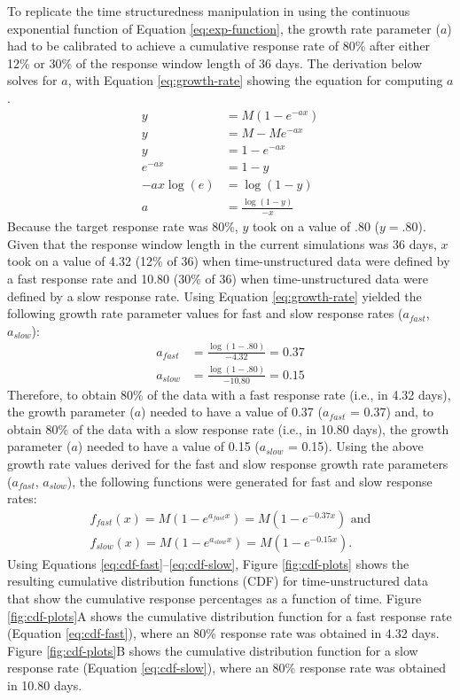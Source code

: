 \documentclass[
12pt, %
twoside,
english]{guelphthesis}
\begin{document}
To replicate the time structuredness manipulation in \textcite{coulombe2016} using the continuous exponential function of Equation \ref{eq:exp-function}, the growth rate parameter (\(a\)) had to be calibrated to achieve a cumulative response rate of 80\% after either 12\% or 30\% of the response window length of 36 days. The derivation below solves for \(a\), with Equation \ref{eq:growth-rate} showing the equation for computing \(a\).
\begin{align}
y  &= M(1 - e^{-ax}) \nonumber \\
y &= M - Me^{-ax} \nonumber \\
y &= 1 -e^{-ax} \nonumber \\
e^{-ax} &= 1-y \nonumber \\
-ax\log(e) &= \log(1 - y) \nonumber \\
a &= \frac{\log(1 - y)}{-x}
\label{eq:growth-rate}
\end{align}
\noindent Because the target response rate was 80\%, \(y\) took on a value of .80 (\(y = .80\)). Given that the response window length in the current simulations was 36 days, \(x\) took on a value of 4.32 (12\% of 36) when time-unstructured data were defined by a fast response rate and 10.80 (30\% of 36) when time-unstructured data were defined by a slow response rate. Using Equation \ref{eq:growth-rate} yielded the following growth rate parameter values for fast and slow response rates (\(a_{fast}\), \(a_{slow}\)):
\begin{align}
a_{fast} &= \frac{\log(1 - .80)}{-4.32} = 0.37 \nonumber \\
a_{slow} &= \frac{\log(1 - .80)}{-10.80} = 0.15 \nonumber
\end{align}
\noindent Therefore, to obtain 80\% of the data with a fast response rate (i.e., in 4.32 days), the growth parameter (\(a\)) needed to have a value of 0.37 (\(a_{fast}\) = 0.37) and, to obtain 80\% of the data with a slow response rate (i.e., in 10.80 days), the growth parameter (\(a\)) needed to have a value of 0.15 (\(a_{slow}\) = 0.15). Using the above growth rate values derived for the fast and slow response growth rate parameters (\(a_{fast}\), \(a_{slow}\)), the following functions were generated for fast and slow response rates:
\begin{align}
f_{fast}(x) = M(1 - e^{a_{fast}x}) = M(1 - e^{-0.37x}) \text{ and} \label{eq:cdf-fast}\\
f_{slow}(x) = M(1 - e^{a_{slow}x}) = M(1 - e^{-0.15x}).\label{eq:cdf-slow}
\end{align}
\noindent Using Equations \ref{eq:cdf-fast}--\ref{eq:cdf-slow}, Figure \ref{fig:cdf-plots} shows the resulting cumulative distribution functions (CDF) for time-unstructured data that show the cumulative response percentages as a function of time. Figure \ref{fig:cdf-plots}A shows the cumulative distribution function for a fast response rate (Equation \ref{eq:cdf-fast}), where an 80\% response rate was obtained in 4.32 days. Figure \ref{fig:cdf-plots}B shows the cumulative distribution function for a slow response rate (Equation \ref{eq:cdf-slow}), where an 80\% response rate was obtained in 10.80 days.
\end{document}

